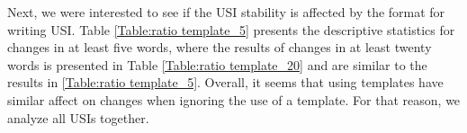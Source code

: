 


Next, we were interested to see if the USI stability is affected by the format for writing USI. Table \ref{Table:ratio template_5} presents the descriptive statistics for changes in at least five words, where the results of changes in at least twenty words is presented in Table \ref{Table:ratio template_20} and are similar to the results in \ref{Table:ratio template_5}. Overall, it seems that using templates have similar affect on changes when ignoring the use of a template. For that reason, we analyze all USIs together. 


